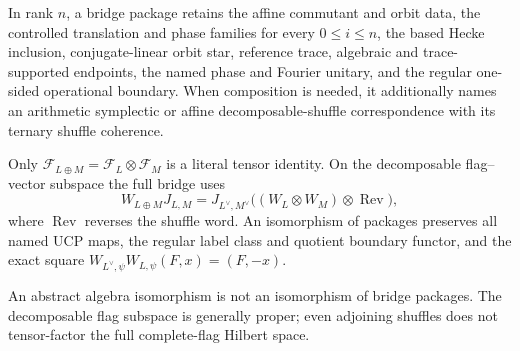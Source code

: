 \begin{definition}
In rank $n$, a bridge package retains the affine commutant and orbit data,
the controlled translation and phase families for every $0\leq i\leq n$,
the based Hecke inclusion, conjugate-linear orbit star, reference trace,
algebraic and trace-supported endpoints, the named phase and Fourier unitary,
and the regular one-sided operational boundary.  When composition is needed,
it additionally names an arithmetic symplectic or affine decomposable-shuffle
correspondence with its ternary shuffle coherence.

Only $\mathcal F_{L\oplus M}=\mathcal F_L\otimes\mathcal F_M$ is a literal
tensor identity.  On the decomposable flag--vector subspace the full bridge
uses
\[
 W_{L\oplus M}J_{L,M}
 =J_{L^\vee,M^\vee}
   \bigl((W_L\otimes W_M)\otimes\operatorname{Rev}\bigr),
\]
where $\operatorname{Rev}$ reverses the shuffle word.  An isomorphism of
packages preserves all named UCP maps, the regular label class and quotient
boundary functor, and the exact square
$W_{L^\vee,\psi}W_{L,\psi}(F,x)=(F,-x)$.
\end{definition}
\begin{scope}
An abstract algebra isomorphism is not an isomorphism of bridge packages.
The decomposable flag subspace is generally proper; even adjoining shuffles
does not tensor-factor the full complete-flag Hilbert space.
\end{scope}
